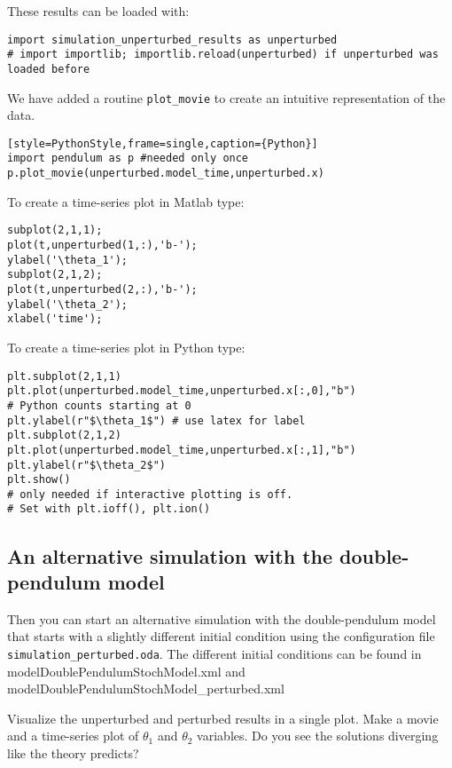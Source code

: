       
These results can be loaded with:
\begin{lstlisting}[style=PythonStyle, caption={Python initialize}]
import simulation_unperturbed_results as unperturbed
# import importlib; importlib.reload(unperturbed) if unperturbed was loaded before\end{lstlisting}
      We have added a routine \lstinline{plot_movie} to create an intuitive
      representation of the data. 
\begin{lstlisting}[style=PythonStyle, caption={Python}][style=PythonStyle,frame=single,caption={Python}]
import pendulum as p #needed only once
p.plot_movie(unperturbed.model_time,unperturbed.x)\end{lstlisting}
      
\ifshowmatlab
To create a time-series plot in Matlab type:
\begin{lstlisting}[style=MatlabStyle,frame=single,caption={Matlab}]
subplot(2,1,1);
plot(t,unperturbed(1,:),'b-');
ylabel('\theta_1');
subplot(2,1,2);
plot(t,unperturbed(2,:),'b-');
ylabel('\theta_2');
xlabel('time');
\end{lstlisting}
\fi
      
To create a time-series plot in Python type:
\begin{lstlisting}[style=PythonStyle,caption={Python}]
plt.subplot(2,1,1)
plt.plot(unperturbed.model_time,unperturbed.x[:,0],"b") 
# Python counts starting at 0
plt.ylabel(r"$\theta_1$") # use latex for label
plt.subplot(2,1,2)
plt.plot(unperturbed.model_time,unperturbed.x[:,1],"b")
plt.ylabel(r"$\theta_2$")
plt.show() 
# only needed if interactive plotting is off. 
# Set with plt.ioff(), plt.ion()
\end{lstlisting}
%
\subsection{An alternative simulation with the double-pendulum model}

Then you can start an alternative simulation with the double-pendulum model that
starts with a slightly different initial condition using the
configuration file \texttt{ simulation\_perturbed.oda}. The different initial conditions
can be found in {\ttfamily model\/DoublePendulumStochModel.xml} and {\ttfamily model\/DoublePendulumStochModel\_perturbed.xml}

Visualize the unperturbed and perturbed results in a single plot. Make
       a movie and a time-series plot of $\theta_1$ and $\theta_2$ variables. Do you see
       the solutions diverging like the theory predicts?
       
